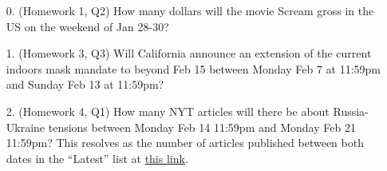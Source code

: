 \documentclass[11pt]{article}
\begin{document}
\begin{enumerate}
	\item[0.] (Homework 1, Q2) How many dollars will the movie Scream gross in the US on the weekend of Jan 28-30?

	\item[1.] (Homework 3, Q3) Will California announce an extension of the current indoors mask mandate to beyond Feb 15 between Monday Feb 7 at 11:59pm and Sunday Feb 13 at 11:59pm?

	\item[2.] (Homework 4, Q1) How many NYT articles will there be about Russia-Ukraine tensions between Monday Feb 14 11:59pm and Monday Feb 21 11:59pm? This resolves as the number of articles published between both dates in the ``Latest'' list at \href{https://www.nytimes.com/news-event/ukraine-russia?name=styln-russia-ukraine&region=TOP_BANNER&block=storyline_menu_recirc&action=click&pgtype=LegacyCollection&variant=0_Control}{this link}.
\end{enumerate}
\end{document}
